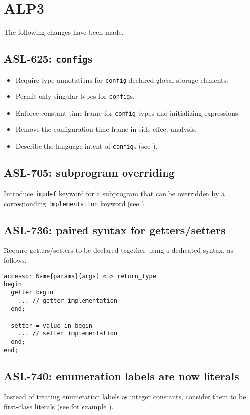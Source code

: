\section{ALP3}

The following changes have been made.

\subsection{ASL-625: \texttt{config}s}
\begin{itemize}
  \item Require type annotations for \texttt{config}-declared global storage elements.
  \item Permit only singular types for \texttt{config}s.
  \item Enforce constant time-frame for \texttt{config} types and initializing expressions.
  \item Remove the configuration time-frame in side-effect analysis.
  \item Describe the language intent of \texttt{config}s (see ).
\end{itemize}

\subsection{ASL-705: subprogram overriding}
Introduce \texttt{impdef} keyword for a subprogram that can be overridden by a corresponding \texttt{implementation} keyword (see ).

\subsection{ASL-736: paired syntax for getters/setters}
Require getters/setters to be declared together using a dedicated syntax, as follows:
\begin{lstlisting}
accessor Name{params}(args) <=> return_type
begin
  getter begin
    ... // getter implementation
  end;

  setter = value_in begin
    ... // setter implementation
  end;
end;
\end{lstlisting}

\subsection{ASL-740: enumeration labels are now literals}
Instead of treating enumeration labels as integer constants, consider them to be first-class literals (see for example ).

